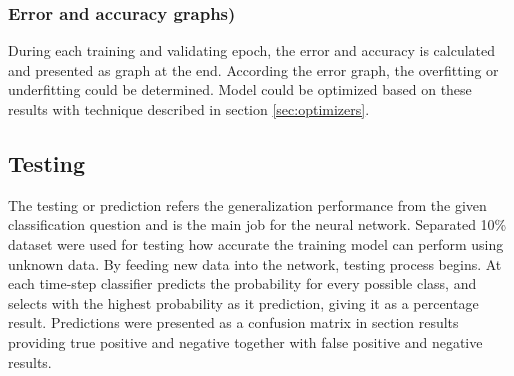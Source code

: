 \subsubsection{Error and accuracy graphs)}
During each training and validating epoch, the error and accuracy is calculated and presented as graph at the end. According the error graph, the overfitting or underfitting could be determined. Model could be optimized based on these results with technique described in section \ref{sec:optimizers}.

\subsection{Testing}
The testing or prediction refers the generalization performance from the given classification question and is the main job for the neural network.
Separated 10\% dataset were used for testing how accurate the training model can perform using unknown data. By feeding new data into the network, testing process begins. At each time-step classifier predicts the probability for every possible class, and selects with the highest probability as it prediction, giving it as a percentage result. Predictions were presented as a confusion matrix in section {results} providing true positive and negative together with false positive and negative results.
